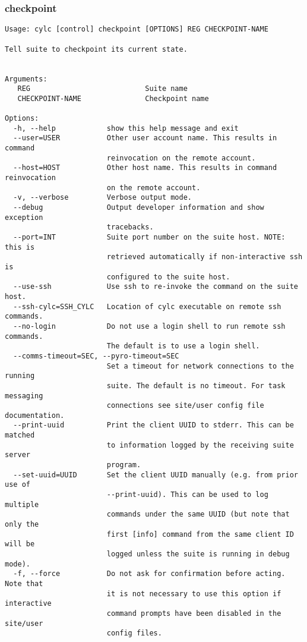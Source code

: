 \subsubsection{checkpoint}
\label{checkpoint}
\begin{lstlisting}
Usage: cylc [control] checkpoint [OPTIONS] REG CHECKPOINT-NAME 

Tell suite to checkpoint its current state.


Arguments:
   REG                           Suite name
   CHECKPOINT-NAME               Checkpoint name

Options:
  -h, --help            show this help message and exit
  --user=USER           Other user account name. This results in command
                        reinvocation on the remote account.
  --host=HOST           Other host name. This results in command reinvocation
                        on the remote account.
  -v, --verbose         Verbose output mode.
  --debug               Output developer information and show exception
                        tracebacks.
  --port=INT            Suite port number on the suite host. NOTE: this is
                        retrieved automatically if non-interactive ssh is
                        configured to the suite host.
  --use-ssh             Use ssh to re-invoke the command on the suite host.
  --ssh-cylc=SSH_CYLC   Location of cylc executable on remote ssh commands.
  --no-login            Do not use a login shell to run remote ssh commands.
                        The default is to use a login shell.
  --comms-timeout=SEC, --pyro-timeout=SEC
                        Set a timeout for network connections to the running
                        suite. The default is no timeout. For task messaging
                        connections see site/user config file documentation.
  --print-uuid          Print the client UUID to stderr. This can be matched
                        to information logged by the receiving suite server
                        program.
  --set-uuid=UUID       Set the client UUID manually (e.g. from prior use of
                        --print-uuid). This can be used to log multiple
                        commands under the same UUID (but note that only the
                        first [info] command from the same client ID will be
                        logged unless the suite is running in debug mode).
  -f, --force           Do not ask for confirmation before acting. Note that
                        it is not necessary to use this option if interactive
                        command prompts have been disabled in the site/user
                        config files.
\end{lstlisting}
